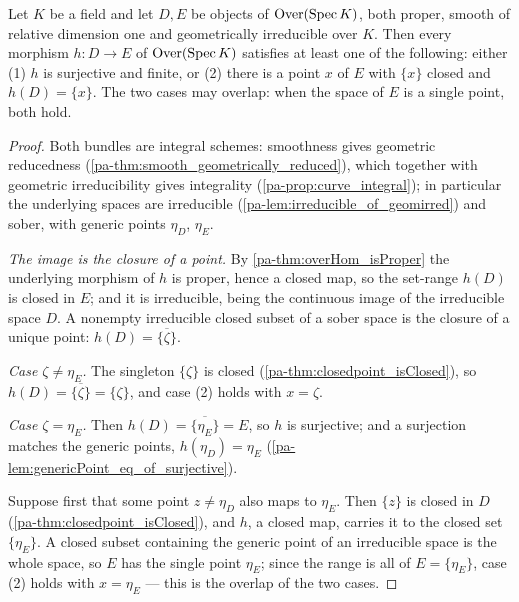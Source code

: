 \begin{theorem}
  \label{pa-thm:curveHom_isFinite_or_constant}
  \leanok

  Let \(K\) be a field and let \(D, E\) be objects of \(\mathrm{Over}(\operatorname{Spec} K)\), both proper,
  smooth of relative dimension one and geometrically irreducible over \(K\). Then every
  morphism \(h : D \to E\) of \(\mathrm{Over}(\operatorname{Spec} K)\) satisfies at least one of the
  following: either (1) \(h\) is surjective and finite, or (2) there is a point \(x\)
  of \(E\) with \(\{x\}\) closed and \(h(D) = \{x\}\). The two cases may overlap: when
  the space of \(E\) is a single point, both hold.
\end{theorem}
\begin{proof}
  \leanok
  Both bundles are integral schemes: smoothness gives geometric reducedness
  (\ref{pa-thm:smooth_geometrically_reduced}), which together with geometric
  irreducibility gives integrality (\ref{pa-prop:curve_integral}); in particular the
  underlying spaces are irreducible (\ref{pa-lem:irreducible_of_geomirred}) and sober,
  with generic points \(\eta_D\), \(\eta_E\).

  \emph{The image is the closure of a point.} By \ref{pa-thm:overHom_isProper} the
  underlying morphism of \(h\) is proper, hence a closed map, so the set-range
  \(h(D)\) is closed in \(E\); and it is irreducible, being the continuous image of
  the irreducible space \(D\). A nonempty irreducible closed subset of a sober space is
  the closure of a unique point: \(h(D) = \overline{\{\zeta\}}\).

  \emph{Case \(\zeta \neq \eta_E\).} The singleton \(\{\zeta\}\) is closed
  (\ref{pa-thm:closedpoint_isClosed}), so \(h(D) = \overline{\{\zeta\}} = \{\zeta\}\), and
  case (2) holds with \(x = \zeta\).

  \emph{Case \(\zeta = \eta_E\).} Then \(h(D) = \overline{\{\eta_E\}} = E\), so \(h\)
  is surjective; and a surjection matches the generic points, \(h(\eta_D) = \eta_E\)
  (\ref{pa-lem:genericPoint_eq_of_surjective}).

  Suppose first that some point \(z \neq \eta_D\) also maps to \(\eta_E\). Then
  \(\{z\}\) is closed in \(D\) (\ref{pa-thm:closedpoint_isClosed}), and \(h\), a closed
  map, carries it to the closed set \(\{\eta_E\}\). A closed subset containing the
  generic point of an irreducible space is the whole space, so \(E\) has the single
  point \(\eta_E\); since the range is all of \(E = \{\eta_E\}\), case (2) holds with
  \(x = \eta_E\) --- this is the overlap of the two cases.


\end{proof}
